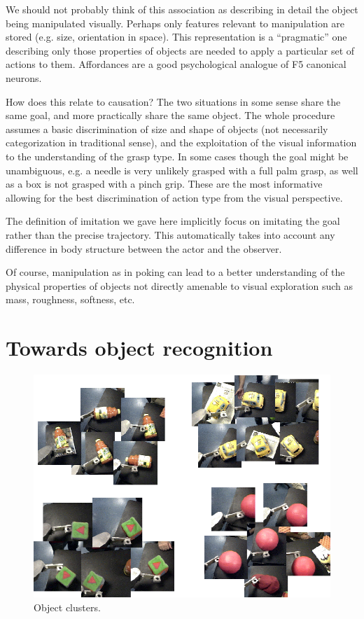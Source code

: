 We should not probably think of this association as describing in
detail the object being manipulated visually. Perhaps only features
relevant to manipulation are stored (e.g. size, orientation in space).
This representation is a ``pragmatic'' one describing only those
properties of objects are needed to apply a particular set of actions
to them. Affordances are a good psychological analogue of F5
canonical neurons.
\fi


\ifverbose
How does this relate to causation?  The two situations in some sense
share the same goal, and more practically share the same object.  The
whole procedure assumes a basic discrimination of size and shape of
objects (not necessarily categorization in traditional sense), and the
exploitation of the visual information to the understanding of the
grasp type. In some cases though the goal might be unambiguous, e.g. a
needle is very unlikely grasped with a full palm grasp, as well as a
box is not grasped with a pinch grip. These are the most informative
allowing for the best discrimination of action type from the visual
perspective.
\fi

\ifverbose
The definition of imitation we gave here implicitly focus on imitating
the goal rather than the precise trajectory. This automatically takes
into account any difference in body structure between the actor and
the observer.

Of course, manipulation as in poking can lead to a better
understanding of the physical properties of objects not directly
amenable to visual exploration such as mass, roughness, softness, etc.
\fi


\section{Towards object recognition}

\begin{figure}[tbh]
\begin{center}
\includegraphics[width=12cm]{fig-object-clusters.eps}
\caption{ 
\label{fig:objects-clusters}
%
Object clusters.
%
}
\end{center}
\end{figure}

